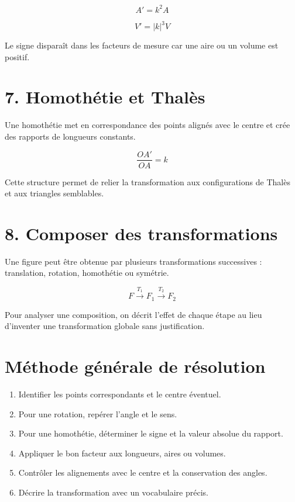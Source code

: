 \[
A'=k^2A
\]

\[
V'=|k|^3V
\]

\begin{exemple}
Le signe disparaît dans les facteurs de mesure car une aire ou un volume est positif.
\end{exemple}

\section{7. Homothétie et Thalès}
Une homothétie met en correspondance des points alignés avec le centre et crée des rapports de longueurs constants.

\[
\dfrac{OA'}{OA}=k
\]

\begin{exemple}
Cette structure permet de relier la transformation aux configurations de Thalès et aux triangles semblables.
\end{exemple}

\section{8. Composer des transformations}
Une figure peut être obtenue par plusieurs transformations successives : translation, rotation, homothétie ou symétrie.

\[
F\xrightarrow{T_1}F_1\xrightarrow{T_2}F_2
\]

\begin{exemple}
Pour analyser une composition, on décrit l’effet de chaque étape au lieu d’inventer une transformation globale sans justification.
\end{exemple}

\section{Méthode générale de résolution}
\begin{methode}
\begin{enumerate}
\item Identifier les points correspondants et le centre éventuel.
\item Pour une rotation, repérer l’angle et le sens.
\item Pour une homothétie, déterminer le signe et la valeur absolue du rapport.
\item Appliquer le bon facteur aux longueurs, aires ou volumes.
\item Contrôler les alignements avec le centre et la conservation des angles.
\item Décrire la transformation avec un vocabulaire précis.
\end{enumerate}
\end{methode}

